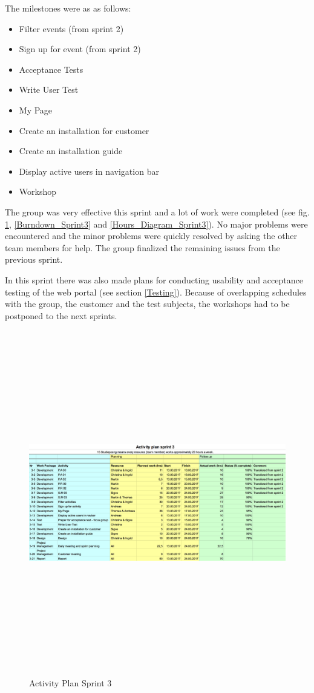 The milestones were as as follows: 
\begin{itemize}
    \item Filter events (from sprint 2)
    \item Sign up for event (from sprint 2)
    \item Acceptance Tests
    \item Write User Test
    \item My Page
    \item Create an installation for customer
    \item Create an installation guide
    \item Display active users in navigation bar
    \item Workshop
\end{itemize}

The group was very effective this sprint and a lot of work were completed (see fig. \ref{Activity_Plan}, \ref{Burndown_Sprint3} and \ref{Hours_Diagram_Sprint3}). No major problems were encountered and the minor problems were quickly resolved by asking the other team members for help. The group finalized the remaining issues from the previous sprint.

In this sprint there was also made plans for conducting usability and acceptance testing of the web portal (see section \ref{Testing}). Because of overlapping schedules with the group, the customer and the test subjects, the workshops had to be postponed to the next sprints.

\begin{figure}[ht]
\centering
    \includegraphics[angle=90,height=150mm,width=\textwidth]{fig/activity_plan_3}
\caption{Activity Plan Sprint 3}
\label{Activity_Plan}
\end{figure}

